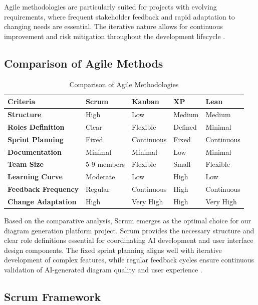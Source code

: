 Agile methodologies are particularly suited for projects with evolving requirements, where frequent stakeholder feedback and rapid adaptation to changing needs are essential. The iterative nature allows for continuous improvement and risk mitigation throughout the development lifecycle \cite{agile_benefits}.

\subsection{Comparison of Agile Methods}

\begin{table}[htbp]
\centering
\caption{Comparison of Agile Methodologies}
\label{tab:agile_comparison}
\begin{tabular}{|p{2cm}|p{2.5cm}|p{2.5cm}|p{2.5cm}|p{2.5cm}|}
\hline
\textbf{Criteria} & \textbf{Scrum} & \textbf{Kanban} & \textbf{XP} & \textbf{Lean} \\
\hline
\textbf{Structure} & High & Low & Medium & Medium \\
\hline
\textbf{Roles Definition} & Clear & Flexible & Defined & Minimal \\
\hline
\textbf{Sprint Planning} & Fixed & Continuous & Fixed & Continuous \\
\hline
\textbf{Documentation} & Minimal & Minimal & Low & Minimal \\
\hline
\textbf{Team Size} & 5-9 members & Flexible & Small & Flexible \\
\hline
\textbf{Learning Curve} & Moderate & Low & High & Low \\
\hline
\textbf{Feedback Frequency} & Regular & Continuous & High & Continuous \\
\hline
\textbf{Change Adaptation} & High & Very High & High & Very High \\
\hline
\end{tabular}
\end{table}

Based on the comparative analysis, Scrum emerges as the optimal choice for our diagram generation platform project. Scrum provides the necessary structure and clear role definitions essential for coordinating AI development and user interface design components. The fixed sprint planning aligns well with iterative development of complex features, while regular feedback cycles ensure continuous validation of AI-generated diagram quality and user experience \cite{scrum_advantages}.

\subsection{Scrum Framework}

